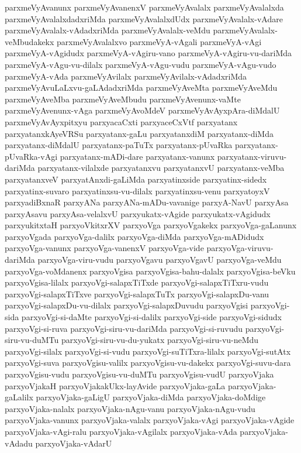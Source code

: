 {parxmeVyAvanunx
parxmeVyAvanenxV
parxmeVyAvalalx
parxmeVyAvalalxda
parxmeVyAvalalxdadxriMda
parxmeVyAvalalxdUdx
parxmeVyAvalalx-vAdare
parxmeVyAvalalx-vAdadxriMda
parxmeVyAvalalx-veMdu
parxmeVyAvalalx-veMbudakekx
parxmeVyAvalalxvo
parxmeVyA-vAgali
parxmeVyA-vAgi
parxmeVyA-vAgidudx
parxmeVyA-vAgiru-vano
parxmeVyA-vAgiru-vu-dariMda
parxmeVyA-vAgu-vu-dilalx
parxmeVyA-vAgu-vudu
parxmeVyA-vAgu-vudo
parxmeVyA-vAda
parxmeVyAvilalx
parxmeVyAvilalx-vAdadxriMda
parxmeVyAvuLaLxvu-gaLAdadxriMda
parxmeVyAveMta
parxmeVyAveMdu
parxmeVyAveMba
parxmeVyAveMbudu
parxmeVyAvenunx-vaMte
parxmeVyAvenunx-vAga
parxmeVyAvoMdeV
parxmeVyAvAyxpAra-diMdalU
parxmeVyAvAyxpitxyu
parxyacaCxti
parxyaceCxVtf
parxyatanx
parxyatanxkAyeVRSu
parxyatanx-gaLu
parxyatanxdiM
parxyatanx-diMda
parxyatanx-diMdalU
parxyatanx-paTuTx
parxyatanx-pUvaRka
parxyatanx-pUvaRka-vAgi
parxyatanx-mADi-dare
parxyatanx-vanunx
parxyatanx-viruvu-dariMda
parxyatanx-vilalxde
parxyatanxvu
parxyatanxvU
parxyatanx-veMba
parxyatanxveV
parxyatAnxdi-gaLiMda
parxyatinxside
parxyatinx-sidedx
parxyatinx-suvaro
parxyatinxsu-vu-dilalx
parxyatinxsu-venu
parxyatoyxV
parxyadiBxnaR
parxyANa
parxyANa-mADu-vavanige
parxyA-NavU
parxyAsa
parxyAsavu
parxyAsa-velalxvU
parxyukatx-vAgide
parxyukatx-vAgidudx
parxyukitxtaH
parxyoVkitxrXV
parxyoVga
parxyoVgakekx
parxyoVga-gaLanunx
parxyoVgada
parxyoVga-dalilx
parxyoVga-diMda
parxyoVga-mADidudx
parxyoVga-vanunx
parxyoVga-vanenxV
parxyoVga-vide
parxyoVga-viruvu-dariMda
parxyoVga-viru-vudu
parxyoVgavu
parxyoVgavU
parxyoVga-veMdu
parxyoVga-voMdanenx
parxyoVgisa
parxyoVgisa-bahu-dalalx
parxyoVgisa-beVku
parxyoVgisa-lilalx
parxyoVgi-salapxTiTxde
parxyoVgi-salapxTiTxru-vudu
parxyoVgi-salapxTiTxve
parxyoVgi-salapxTuTx
parxyoVgi-salapxDu-vanu
parxyoVgi-salapxDu-vu-dilalx
parxyoVgi-salapxDuvudu
parxyoVgisi
parxyoVgi-sida
parxyoVgi-si-daMte
parxyoVgi-si-dalilx
parxyoVgi-side
parxyoVgi-sidudx
parxyoVgi-si-ruva
parxyoVgi-siru-vu-dariMda
parxyoVgi-si-ruvudu
parxyoVgi-siru-vu-duMTu
parxyoVgi-siru-vu-du-yukatx
parxyoVgi-siru-vu-neMdu
parxyoVgi-silalx
parxyoVgi-si-vudu
parxyoVgi-suTiTxra-lilalx
parxyoVgi-sutAtx
parxyoVgi-suva
parxyoVgisu-valilx
parxyoVgisu-vu-dakekx
parxyoVgi-suvu-dara
parxyoVgisu-vudu
parxyoVgisu-vu-duMTu
parxyoVgisu-vudU
parxyoVjaka
parxyoVjakaH
parxyoVjakakUkx-layAvide
parxyoVjaka-gaLa
parxyoVjaka-gaLalilx
parxyoVjaka-gaLigU
parxyoVjaka-diMda
parxyoVjaka-doMdige
parxyoVjaka-nalalx
parxyoVjaka-nAgu-vanu
parxyoVjaka-nAgu-vudu
parxyoVjaka-vanunx
parxyoVjaka-valalx
parxyoVjaka-vAgi
parxyoVjaka-vAgide
parxyoVjaka-vAgi-ralu
parxyoVjaka-vAgilalx
parxyoVjaka-vAda
parxyoVjaka-vAdadu
parxyoVjaka-vAdarU
}
